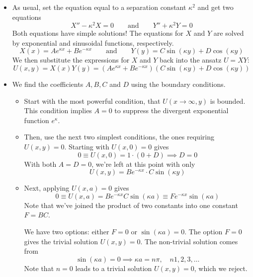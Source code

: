 \documentclass[11pt, a4paper]{article}
\newcommand{\eqtext}[1]{\qquad \text{#1} \qquad}
\begin{document}
\begin{itemize}
	\item As usual, set the equation equal to a separation constant $ \kappa^{2} $ and get two equations
	\begin{equation*}
		X'' - \kappa^{2}X = 0 \eqtext{and} Y'' + \kappa^{2} Y = 0
	\end{equation*}
	Both equations have simple solutions! The equations for $ X $ and $ Y $ are solved by exponential and sinusoidal functions, respectively.
	\begin{equation*}
		X(x) = Ae^{\kappa x} + Be^{-\kappa x} \eqtext{and} Y(y) = C\sin(\kappa y) + D\cos (\kappa y)
	\end{equation*}
	We then substitute the expressions for $ X $ and $ Y $ back into the ansatz $ U = XY $:
	\begin{equation*}
		U(x, y)  = X(x)Y(y) = \left(Ae^{\kappa x} + Be^{-\kappa x}\right)\left(C\sin(\kappa y) + D\cos (\kappa y)\right)
	\end{equation*}
	
	
	\item We find the coefficients $ A, B, C $ and $ D $ using the boundary conditions. 
	\begin{itemize}
		\item Start with the most powerful condition, that $ U(x \to \infty, y) $ is bounded. This condition implies $ A = 0 $ to suppress the divergent exponential function $ e^{\kappa } $. 
			
		\item Then, use the next two simplest conditions, the ones requiring $ U(x, y) = 0 $. Starting with $ U(x, 0) = 0 $ gives
		\begin{equation*}
			0 \equiv U(x, 0) = 1 \cdot (0 + D) \implies D = 0
		\end{equation*}
		With both $ A = D = 0 $, we're left at this point with only 
		\begin{equation*}
			U(x, y) = Be^{-\kappa x} \cdot C \sin (\kappa y)
		\end{equation*}
		
		\item Next, applying $ U(x, a) = 0$ gives
		\begin{equation*}
			0 \equiv U(x, a) = Be^{-\kappa x} C \sin (\kappa a) \equiv F e^{-\kappa x} \sin (\kappa a)
		\end{equation*} 
		Note that we've joined the product of two constants into one constant $ F = BC $. 
		
		We have two options: either $ F = 0 $ or $ \sin (\kappa a) = 0$. The option $ F = 0 $ gives the trivial solution $ U(x, y) = 0 $. The non-trivial solution comes from 
		\begin{equation*}
			\sin(\kappa a ) = 0 \implies \kappa a = n \pi, \quad n 1, 2, 3, \ldots
		\end{equation*}
		Note that $ n = 0 $ leads to a trivial solution $ U(x, y) = 0 $, which we reject.
		

\end{itemize}
\end{itemize}
\end{document}
